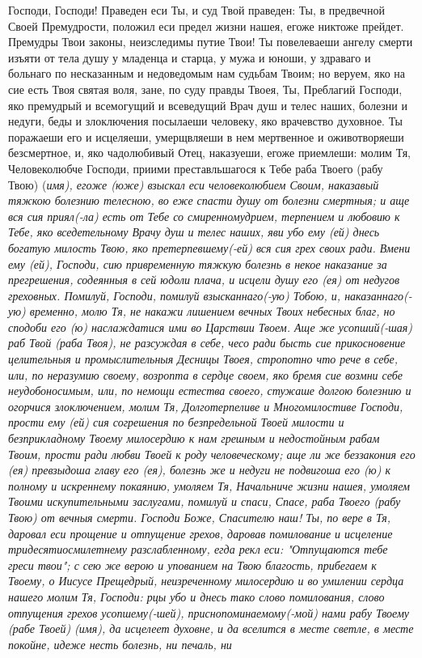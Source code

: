 \mychapterending

 


Господи, Господи! Праведен еси Ты, и суд Твой праведен: Ты, в предвечной Своей Премудрости, положил еси предел жизни нашея, егоже никтоже прейдет. Премудры Твои законы, неизследимы путие Твои! Ты повелеваеши ангелу смерти изъяти от тела душу у младенца и старца, у мужа и юноши, у здраваго и больнаго по несказанным и недоведомым нам судьбам Твоим; но веруем, яко на сие есть Твоя святая воля, зане, по суду правды Твоея, Ты, Преблагий Господи, яко премудрый и всемогущий и всеведущий Врач душ и телес наших, болезни и недуги, беды и злоключения посылаеши человеку, яко врачевство духовное. Ты поражаеши его и исцеляеши, умерщвляеши в нем мертвенное и оживотворяеши безсмертное, и, яко чадолюбивый Отец, наказуеши, егоже приемлеши: молим Тя, Человеколюбче Господи, приими преставльшагося к Тебе раба Твоего (рабу Твою) (\itshape имя\normalfont{}), егоже (юже) взыскал еси человеколюбием Своим, наказавый тяжкою болезнию телесною, во еже спасти душу от болезни смертныя; и аще вся сия приял(-ла) есть от Тебе со смиренномудрием, терпением и любовию к Тебе, яко вседетельному Врачу душ и телес наших, яви убо ему (ей) днесь богатую милость Твою, яко претерпевшему(-ей) вся сия грех своих ради. Вмени ему (ей), Господи, сию привременную тяжкую болезнь в некое наказание за прегрешения, содеянныя в сей юдоли плача, и исцели душу его (ея) от недугов греховных. Помилуй, Господи, помилуй взысканнаго(-ую) Тобою, и, наказаннаго(-ую) временно, молю Тя, не накажи лишением вечных Твоих небесных благ, но сподоби его (ю) наслаждатися ими во Царствии Твоем. Аще же усопший(-шая) раб Твой (раба Твоя), не разсуждая в себе, чесо ради бысть сие прикосновение целительныя и промыслительныя Десницы Твоея, стропотно что рече в себе, или, по неразумию своему, возропта в сердце своем, яко бремя сие возмни себе неудобоносимым, или, по немощи естества своего, стужаше долгою болезнию и огорчися злоключением, молим Тя, Долготерпеливе и Многомилостиве Господи, прости ему (ей) сия согрешения по безпредельной Твоей милости и безприкладному Твоему милосердию к нам грешным и недостойным рабам Твоим, прости ради любви Твоей к роду человеческому; аще ли же беззакония его (ея) превзыдоша главу его (ея), болезнь же и недуги не подвигоша его (ю) к полному и искреннему покаянию, умоляем Тя, Начальниче жизни нашея, умоляем Твоими искупительными заслугами, помилуй и спаси, Спасе, раба Твоего (рабу Твою) от вечныя смерти. Господи Боже, Спасителю наш! Ты, по вере в Тя, даровал еси прощение и отпущение грехов, даровав помилование и исцеление тридесятиосмилетнему разслабленному, егда рекл еси: "Отпущаются тебе греси твои"; с сею же верою и упованием на Твою благость, прибегаем к Твоему, о Иисусе Прещедрый, неизреченному милосердию и во умилении сердца нашего молим Тя, Господи: рцы убо и днесь тако слово помилования, слово отпущения грехов усопшему(-шей), приснопоминаемому(-мой) нами рабу Твоему (рабе Твоей) (\itshape имя\normalfont{}), да исцелеет духовне, и да вселится в месте светле, в месте покойне, идеже несть болезнь, ни печаль, ни 